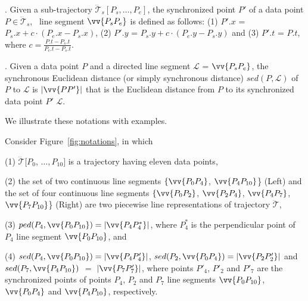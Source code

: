 . Given a sub-trajectory $\dddot{\mathcal{T}}_s[P_s, \ldots, P_e]$, the synchronized point $P'$ of a data point  $P \in \dddot{\mathcal{T}}_s$, ~\wrt line segment $\vv{P_sP_e}$ is defined as follows:
(1) $P'.x$ = $P_s.x +  c\cdot(P_e.x - P_s.x)$,
(2) $P'.y$ = $P_s.y +  c\cdot(P_e.y - P_s.y)$ and
(3) $P'.t$ = $P.t$, where $c= \frac{P.t-P_s.t}{P_e.t-P_s.t}$.


. Given a data point $P$ and a directed line segment $\mathcal{L}$ = $\vv{P_{s}P_{e}}$, the synchronous Euclidean distance (or simply synchronous distance) $sed(P, \mathcal{L})$ of $P$ to $\mathcal{L}$ is $|\vv{PP'}|$ that is the Euclidean distance from $P$ to its synchronized data point $P'$ \wrt $\mathcal{L}$. %




We illustrate these notations with examples.




\begin{example}
\label{exm-notations}
Consider Figure~\ref{fig:notations}, in which

\sstab(1) $\dddot{\mathcal{T}}[P_0$, $\ldots, P_{10}]$ is a trajectory having eleven data points,

\sstab (2) the set of two continuous line segments $\{\vv{P_0P_4}$, $\vv{P_4P_{10}}$\} (Left) and the set of four continuous line segments $\{\vv{P_0P_2}$, $\vv{P_2P_4}$, $\vv{P_4P_7}$, $\vv{P_7P_{10}}$\} (Right) are two piecewise line representations of trajectory $\dddot{\mathcal{T}}$,

\sstab(3) $ped(P_4, \vv{P_0P_{10}})=|\vv{P_4P^*_4}|$, where $P^*_4$ is the perpendicular point of $P_4$ \wrt line segment $\vv{P_0P_{10}}$, and

\sstab (4) $sed(P_4, \vv{P_0P_{10}})= |\vv{P_4P'_4}|$, $sed(P_2, \vv{P_0P_{4}})= |\vv{P_2P'_2}|$ and $sed(P_7, \vv{P_4P_{10}})$ $=$ $|\vv{P_7P'_7}|$,
where points $P'_4$, $P'_2$ and $P'_7$ are the synchronized points of points $P_4$, $P_2$ and $P_7$ \wrt line segments $\vv{P_0P_{10}}$, $\vv{P_0P_{4}}$ and $\vv{P_4P_{10}}$, respectively.
\end{example}

